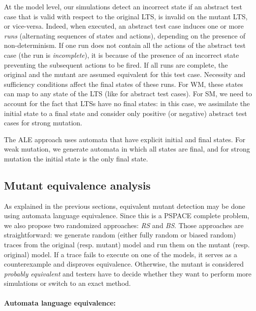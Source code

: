  

At the model level, our simulations detect an incorrect state if an abstract test case that is valid with respect to the original LTS, is invalid on the mutant LTS, or vice-versa. Indeed, when executed, an abstract test case induces one or more \textit{runs} (alternating sequences of states and actions), depending on the presence of non-determinism. If one run does not contain all the actions of the abstract test case (\ie the run is \emph{incomplete}), it is because of the presence of an incorrect state preventing the subsequent actions to be fired. If all runs are complete, the original and the mutant are assumed equivalent for this test case. 
Necessity and sufficiency conditions affect the final states of these runs. For \gls{WM}, these states can map to any state of the LTS (like for abstract test cases). For \gls{SM}, we need to account for the fact that LTSs have no final states: in this case, we assimilate the initial state to a final state and consider only positive (or negative) abstract test cases for strong mutation.

The \gls{ALE} approach uses automata that have explicit initial and final states. For weak mutation, we generate automata in which all states are final, and for strong mutation the initial state is the only final state.

\subsection{Mutant equivalence analysis}

 

As explained in the previous sections, equivalent mutant detection may be done using automata language equivalence. Since this is a PSPACE complete problem, we also propose two randomized approaches: \emph{\gls{RS}} and \emph{\gls{BS}}. Those approaches are straightforward:  we generate random (either fully random or biased random) traces from the original (resp. mutant) model and run them on the mutant (resp. original) model. If a trace fails to execute on one of the models, it serves as a counterexample and disproves equivalence.  Otherwise, the mutant is considered \emph{probably equivalent} and testers have to decide whether they want to perform more simulations or switch to an exact method. 

\paragraph{Automata language equivalence:}

